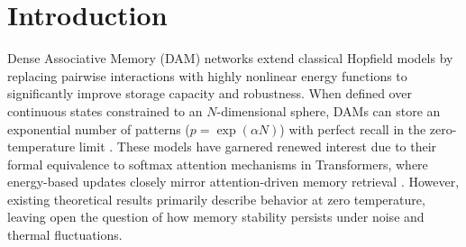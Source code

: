 \documentclass{article}
\theoremstyle{plain}
\theoremstyle{definition}
\theoremstyle{remark}
\begin{document}
\printAffiliationsAndNotice{}  %

\begin{abstract}
We derive thermodynamic phase boundaries for Dense Associative Memory networks with exponential capacity $p = e^{\alpha N}$, comparing Gaussian (LSE) and Epanechnikov (LSR) kernels. For continuous neurons on an $N$-sphere, the geometric entropy depends solely on the spherical geometry, not the kernel. Sufficiently sharp kernels achieve maximum theoretical capacity $\alpha = 0.5$ at zero temperature; below this threshold, a critical line separates retrieval from a spin-glass phase. Kernel sharpness introduces a trade-off between energetic stability and entropic cost: while LSR provides deeper energy minima, it exhibits a smaller retrieval region than LSE at finite temperature because enforcing higher alignment incurs a geometric entropy penalty that outweighs the energetic gain. The kernels also differ qualitatively in their thermal limits: LSR possesses a finite maximum retrieval temperature, whereas LSE permits retrieval at arbitrarily high temperatures for sufficiently low loads.
\end{abstract}

\section{Introduction}

Dense Associative Memory (DAM) networks extend classical Hopfield models by replacing pairwise interactions with highly nonlinear energy functions to significantly improve storage capacity and robustness. When defined over continuous states constrained to an $N$-dimensional sphere, DAMs can store an exponential number of patterns ($p = \exp(\alpha N)$) with perfect recall in the zero-temperature limit \citep{demircigil2017model,ramsauer2021hopfield,lucibello2024exponential}. These models have garnered renewed interest due to their formal equivalence to softmax attention mechanisms in Transformers, where energy-based updates closely mirror attention-driven memory retrieval \citep{ramsauer2021hopfield}. However, existing theoretical results primarily describe behavior at zero temperature, leaving open the question of how memory stability persists under noise and thermal fluctuations.
\end{document}
